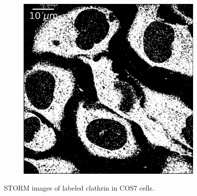 \begin{figure}[htbp]
\begin{subfigure}{0.49\textwidth}
        \includegraphics[width=\textwidth]{figures/clathrin_image12.png}
        \caption{}
    \end{subfigure}
    \caption{STORM images of labeled clathrin in COS7 cells.}
    \label{fig:extra_clathrin_images}
\end{figure}